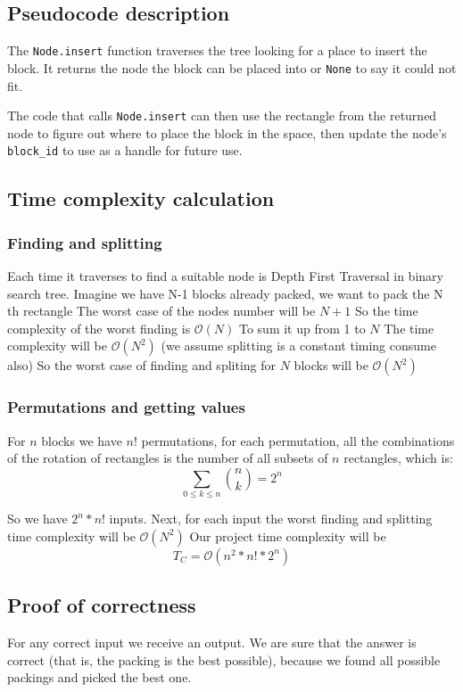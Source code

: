 \subsection{Pseudocode description}
The \texttt{Node.insert} function traverses the tree looking for a place
to insert the block.
It returns the node the block can be placed into or \texttt{None} to say
it could not fit.

The code that calls \texttt{Node.insert} can then use the rectangle
from the returned node to figure out where to place the block in the space,
then update the node's \texttt{block\_id} to use as a handle for future use.

\subsection{Time complexity calculation}

\subsubsection{Finding and splitting}
Each time it traverses to find a suitable node is  Depth First Traversal in binary search tree.
Imagine we have N-1 blocks already packed, we want to pack the N th rectangle
The worst case of the nodes number will be $N+1$
So the time complexity of the worst finding is $\mathcal{O}(N)$
To sum it up from 1 to $N$
The time complexity will be $\mathcal{O}(N^2)$
(we assume splitting is a constant timing consume also) 
So the worst case of finding and spliting for $N$ blocks
will be $\mathcal{O}(N^2)$

\subsubsection{Permutations and getting values}
For $n$ blocks we have $n!$ permutations, for each permutation,
all the combinations of the rotation of rectangles is the number of
all subsets of $n$ rectangles, which is:
$$
\sum_{0 \leq k \leq n} {n \choose k} = 2^n
$$

So we have $2^n * n!$ inputs. Next, for each input the worst
finding and splitting time complexity will be $\mathcal{O}(N^2)$
Our project time complexity will be
$$T_C=\mathcal{O}(n^2*n! * 2^n)$$

\subsection{Proof of correctness}
For any correct input we receive an output.
We are sure that the answer is correct
(that is, the packing is the best possible),
because we found all possible packings and picked the best one.

